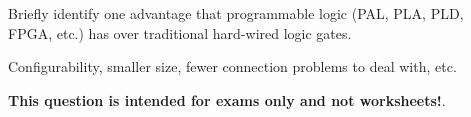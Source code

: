 

Briefly identify one advantage that programmable logic (PAL, PLA, PLD, FPGA, etc.) has over traditional hard-wired logic gates.







Configurability, smaller size, fewer connection problems to deal with, etc.







{\bf This question is intended for exams only and not worksheets!}.




